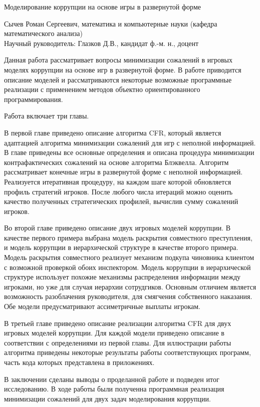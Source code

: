 {\Large Моделирование коррупции на основе игры в развернутой форме
\par}
{\large 
	Сычев Роман Сергеевич, математика  и компьютерные науки (кафедра математического анализа)\\
	Научный руководитель: Глазков Д.В., кандидат ф.-м. н., доцент
\par}
Данная работа рассматривает вопросы минимизации сожалений в игровых моделях коррупции на основе игр в развернутой форме. В работе приводится описание моделей и рассматриваются некоторые возможные программные реализации с применением методов объектно ориентированного программирования.
\par
Работа включает три главы. 
\par
В первой главе приведено описание алгоритма CFR, который является адаптацией алгоритма минимизации сожалений для игр с неполной информацией. В главе приведены все основные определения и описана процедура минимизации контрафактических сожалений на основе алгоритма Блэквелла. Алгоритм рассматривает конечные игры в развернутой форме с неполной информацией. Реализуется итеративная процедуру, на каждом шаге которой обновляется профиль стратегий игроков. После любого числа итераций можно оценить качество полученных стратегических профилей, вычислив сумму сожалений игроков.
\par
Во второй главе приведено описание двух игровых моделей коррупции. В качестве первого примера выбрана модель раскрытия совместного преступления, и модель коррупции в иерархической структуре в качестве второго примера. Модель раскрытия совместного реализует механизм подкупа чиновника клиентом с возможной проверкой обоих инспектором. Модель коррупции в иерархической структуре использует похожие механизмы распределения информации между игроками, но уже для случая иерархии сотрудгиков. Основным отличием является возможность разоблачения руководителя, для смягчения собственного наказания. Обе модели предусматривают ассиметричные выплаты игрокам.
\par
В третьей главе приведено описание реализации алгоритма CFR для двух игровых моделей коррупции. Для каждой модели приведено описание в соответствии с определениями из первой главы. Для иллюстрации работы алгоритма приведены некоторые результаты работы соответствующих программ, часть кода которых представлена в приложениях.
\par
В заключении сделаны выводы о проделанной работе и подведен итог исследованию. В ходе работы были полученна программная реализация минимизации сожалений для двух задач моделирования коррупции.